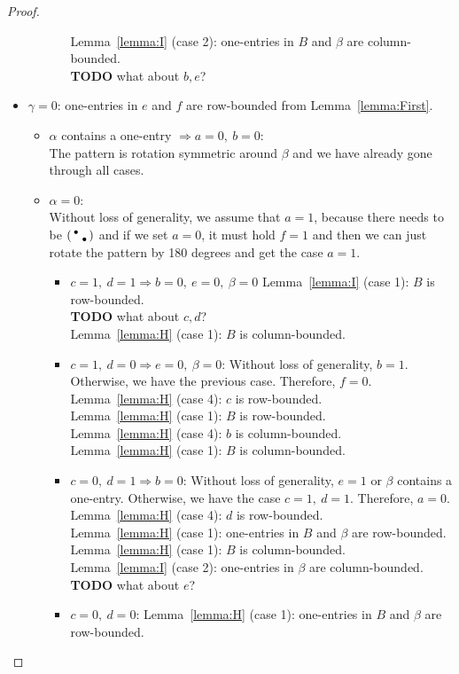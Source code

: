 \begin{proof}
\begin{itemize}
\begin{itemize}
\begin{itemize}
						Lemma~\ref{lemma:I} (case 2): one-entries in $B$ and $\beta$ are column-bounded.\\
						\textbf{TODO} what about $b,e$?
				\end{itemize}
		\end{itemize}
	\item $\gamma=0$: one-entries in $e$ and $f$ are row-bounded from Lemma~\ref{lemma:First}.
		\begin{itemize}
			\item $\alpha$ contains a one-entry $\Rightarrow a=0,\ b=0$:\\
				The pattern is rotation symmetric around $\beta$ and we have already gone through all cases.
			\item $\alpha=0$:\\
				Without loss of generality, we assume that $a=1$, because there needs to be $\left(\begin{smallmatrix}\bullet& \\ &\bullet\end{smallmatrix}\right)$ and if we set $a=0$, it must hold $f=1$ and then we can just rotate the pattern by 180 degrees and get the case $a=1$.
				\begin{itemize}
					\item $c=1,\ d=1\Rightarrow b=0,\ e=0,\ \beta=0$
						Lemma~\ref{lemma:I} (case 1): $B$ is row-bounded.\\
						\textbf{TODO} what about $c,d$?\\
						
						Lemma~\ref{lemma:H} (case 1): $B$ is column-bounded.
					\item $c=1,\ d=0\Rightarrow e=0,\ \beta=0$: Without loss of generality, $b=1$. Otherwise, we have the previous case. Therefore, $f=0$.
						Lemma~\ref{lemma:H} (case 4): $c$ is row-bounded.\\
						Lemma~\ref{lemma:H} (case 1): $B$ is row-bounded.\\
						
						Lemma~\ref{lemma:H} (case 4): $b$ is column-bounded.\\
						Lemma~\ref{lemma:H} (case 1): $B$ is column-bounded.
					\item $c=0,\ d=1\Rightarrow b=0$: Without loss of generality, $e=1$ or $\beta$ contains a one-entry. Otherwise, we have the case $c=1,\ d=1$. Therefore, $a=0$.
						Lemma~\ref{lemma:H} (case 4): $d$ is row-bounded.\\
						Lemma~\ref{lemma:H} (case 1): one-entries in $B$ and $\beta$ are row-bounded.\\
						
						Lemma~\ref{lemma:H} (case 1): $B$ is column-bounded.\\
						Lemma~\ref{lemma:I} (case 2): one-entries in $\beta$ are column-bounded.\\
						\textbf{TODO} what about $e$?
					\item $c=0,\ d=0$:
						Lemma~\ref{lemma:H} (case 1): one-entries in $B$ and $\beta$ are row-bounded.\\
						

\end{itemize}
\end{itemize}
\end{itemize}
\end{proof}
